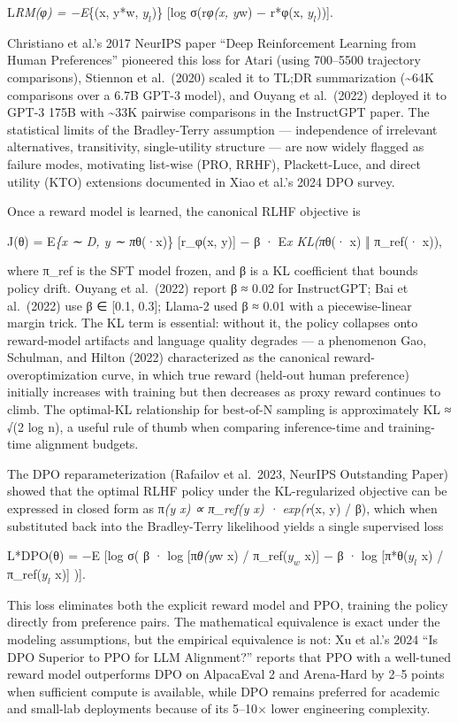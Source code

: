 L\emph{RM(φ) = −E}\{(x, y*w, \(y_l\))\} {[}log σ(r\emph{φ(x, y}w) − r*φ(x, \(y_l\))){]}.

Christiano et al.'s 2017 NeurIPS paper ``Deep Reinforcement Learning from Human Preferences'' pioneered this loss for Atari (using 700--5500 trajectory comparisons), Stiennon et al.~(2020) scaled it to TL;DR summarization (\textasciitilde64K comparisons over a 6.7B GPT-3 model), and Ouyang et al.~(2022) deployed it to GPT-3 175B with \textasciitilde33K pairwise comparisons in the InstructGPT paper. The statistical limits of the Bradley-Terry assumption --- independence of irrelevant alternatives, transitivity, single-utility structure --- are now widely flagged as failure modes, motivating list-wise (PRO, RRHF), Plackett-Luce, and direct utility (KTO) extensions documented in Xiao et al.'s 2024 DPO survey.

Once a reward model is learned, the canonical RLHF objective is

J(θ) = E\emph{\{x ∼ D, y ∼ π}θ(·\textbar x)\} {[}r\_φ(x, y){]} − β · E\emph{x KL(π}θ(· \textbar{} x) ‖ π\_ref(· \textbar{} x)),

where π\_ref is the SFT model frozen, and β is a KL coefficient that bounds policy drift. Ouyang et al.~(2022) report β ≈ 0.02 for InstructGPT; Bai et al.~(2022) use β ∈ {[}0.1, 0.3{]}; Llama-2 used β ≈ 0.01 with a piecewise-linear margin trick. The KL term is essential: without it, the policy collapses onto reward-model artifacts and language quality degrades --- a phenomenon Gao, Schulman, and Hilton (2022) characterized as the canonical reward-overoptimization curve, in which true reward (held-out human preference) initially increases with training but then decreases as proxy reward continues to climb. The optimal-KL relationship for best-of-N sampling is approximately KL ≈ √(2 log n), a useful rule of thumb when comparing inference-time and training-time alignment budgets.

The DPO reparameterization (Rafailov et al.~2023, NeurIPS Outstanding Paper) showed that the optimal RLHF policy under the KL-regularized objective can be expressed in closed form as π\emph{(y \textbar{} x) ∝ π\_ref(y \textbar{} x) · exp(r}(x, y) / β), which when substituted back into the Bradley-Terry likelihood yields a single supervised loss

L*DPO(θ) = −E {[}log σ( β · log {[}π\emph{θ(y}w \textbar{} x) / π\_ref(\(y_w\) \textbar{} x){]} − β · log {[}π*θ(\(y_l\) \textbar{} x) / π\_ref(\(y_l\) \textbar{} x){]} ){]}.

This loss eliminates both the explicit reward model and PPO, training the policy directly from preference pairs. The mathematical equivalence is exact under the modeling assumptions, but the empirical equivalence is not: Xu et al.'s 2024 ``Is DPO Superior to PPO for LLM Alignment?'' reports that PPO with a well-tuned reward model outperforms DPO on AlpacaEval 2 and Arena-Hard by 2--5 points when sufficient compute is available, while DPO remains preferred for academic and small-lab deployments because of its 5--10× lower engineering complexity.

